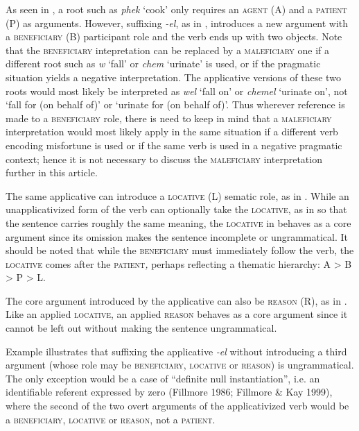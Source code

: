 \documentclass[output=paper]{langsci/langscibook}
\begin{document}
As seen in , a root such as \textit{phek} ‘cook’ only requires an \textsc{agent} (A) and a \textsc{patient} (P) as arguments. However, suffixing \textit{-el}, as in , introduces a new argument with a \textsc{beneficiary} (B) participant role and the verb ends up with two objects. Note that the \textsc{beneficiary} intepretation can be replaced by a \textsc{maleficiary} one if a different root such as \textit{w} ‘fall’ or \textit{chem} ‘urinate’ is used, or if the pragmatic situation yields a negative interpretation. The applicative versions of these two roots would most likely be interpreted as \textit{wel} ‘fall on’ or \textit{chemel} ‘urinate on’, not ‘fall for (on behalf of)’ or ‘urinate for (on behalf of)’. Thus wherever reference is made to a \textsc{beneficiary} role, there is need to keep in mind that a \textsc{maleficiary} interpretation would most likely apply in the same situation if a different verb encoding misfortune is used or if the same verb is used in a negative pragmatic context; hence it is not necessary to discuss the \textsc{maleficiary} interpretation further in this article. 

 The same applicative can introduce a \textsc{locative} (L) sematic role, as in . While an unapplicativized form of the verb can optionally take the \textsc{locative}, as in  so that the sentence carries roughly the same meaning, the \textsc{locative} in  behaves as a core argument since its omission makes the sentence incomplete or ungrammatical. It should be noted that while the \textsc{beneficiary} must immediately follow the verb, the \textsc{locative} comes after the \textsc{patient}\textit{,} perhaps reflecting a thematic hierarchy: A > B > P > L. 

 The core argument introduced by the applicative can also be \textsc{reason} (R), as in . Like an applied \textsc{locative}, an applied \textsc{reason} behaves as a core argument since it cannot be left out without making the sentence ungrammatical. 

 Example  illustrates that suffixing the applicative \textit{-el} without introducing a third argument (whose role may be \textsc{beneficiary}, \textsc{locative} or \textsc{reason}) is ungrammatical. The only exception would be a case of “definite null instantiation”, i.e. an identifiable referent expressed by zero (Fillmore 1986; Fillmore \& Kay 1999), where the second of the two overt arguments of the applicativized verb would be a \textsc{beneficiary}, \textsc{locative} or \textsc{reason}, not a \textsc{patient}.
\end{document}
